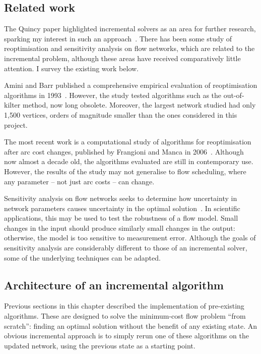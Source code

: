 \subsection{Related work} \label{sec:impl-incremental-related-work}
The Quincy paper highlighted incremental solvers as an area for further research, sparking my interest in such an approach~\cite[\S6.5]{Isard:2007}. There has been some study of reoptimisation and sensitivity analysis on flow networks, which are related to the incremental problem, although these areas have received comparatively little attention. I survey the existing work below.

Amini and Barr published a comprehensive empirical evaluation of reoptimisation algorithms in 1993~\cite{Amini:1993}. However, the study tested algorithms such as the out-of-kilter method, now long obsolete. Moreover, the largest network studied had only 1,500 vertices, orders of magnitude smaller than the ones considered in this project. 

The most recent work is a computational study of algorithms for reoptimisation after arc cost changes, published by Frangioni and Manca in 2006~\cite{Frangioni:2006}. Although now almost a decade old, the algorithms evaluated are still in contemporary use. However, the results of the study may not generalise to flow scheduling, where any parameter -- not just arc costs -- can change. 

Sensitivity analysis on flow networks seeks to determine how uncertainty in network parameters causes uncertainty in the optimal solution~\cite[\S9.11]{Ahuja:1993}. In scientific applications, this may be used to test the robustness of a flow model. Small changes in the input should produce similarly small changes in the output: otherwise, the model is too sensitive to measurement error. Although the goals of sensitivity analysis are considerably different to those of an incremental solver, some of the underlying techniques can be adapted.

\subsection{Architecture of an incremental algorithm} \label{sec:impl-incremental-architecture}

Previous sections in this chapter described the implementation of pre-existing algorithms. These are designed to solve the minimum-cost flow problem ``from scratch'': finding an optimal solution without the benefit of any existing state. An obvious incremental approach is to simply rerun one of these algorithms on the updated network, using the previous state as a starting point.

